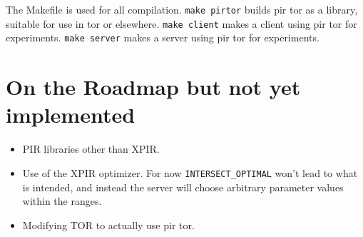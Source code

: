 \documentclass{article}
\begin{document}
    The Makefile is used for all compilation. \texttt{make pirtor} builds pir tor as a library, suitable for use in tor or elsewhere. \texttt{make client} makes a client using pir tor for experiments. \texttt{make server} makes a server using pir tor for experiments.

\section{On the Roadmap but not yet implemented}
    \begin{itemize}
    \item PIR libraries other than XPIR.
    \item Use of the XPIR optimizer. For now \texttt{INTERSECT\_OPTIMAL} won't lead to what is intended, and instead the server will choose arbitrary parameter values within the ranges.
    \item Modifying TOR to actually use pir tor.
    \end{itemize}
\end{document}
